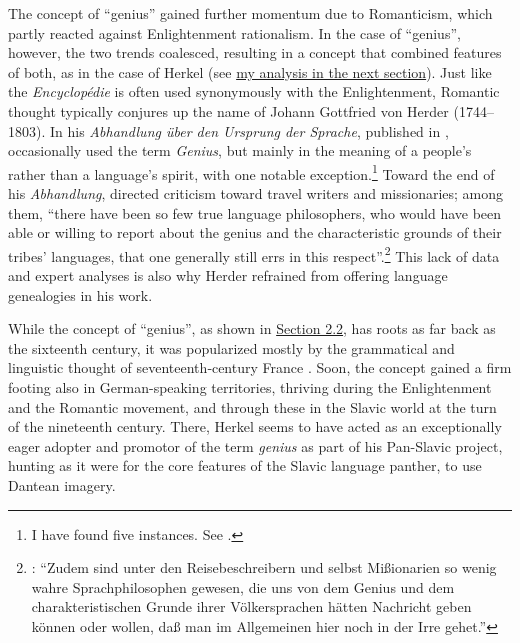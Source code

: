 \noindent The concept of “genius” gained further momentum due to Romanticism, which partly reacted against Enlightenment rationalism. In the case of “genius”, however, the two trends coalesced, resulting in a concept that combined features of both, as in the case of Herkel (see \hyperref[sec:Genius restyled]{my analysis in the next section}). Just like the \textit{Encyclopédie} is often used synonymously with the Enlightenment, Romantic thought typically conjures up the name of Johann Gottfried von Herder (1744--1803). In his \textit{Abhandlung über den Ursprung der Sprache}, published in \citeyear{herder_abhandlung_1772}, \citeauthor{herder_abhandlung_1772} occasionally used the term \textit{Genius}, but mainly in the meaning of a people’s rather than a language’s spirit, with one notable exception.\footnote{I have found five instances. See \citet[81, 85 (twice), 185, 212]{herder_abhandlung_1772}.} Toward the end of his \textit{Abhandlung}, \citet[212]{herder_abhandlung_1772} directed criticism toward travel writers and missionaries; among them, “there have been so few true language philosophers, who would have been able or willing to report about the genius and the characteristic grounds of their tribes’ languages, that one generally still errs in this respect”.\footnote{\citet[212]{herder_abhandlung_1772}: “Zudem sind unter den Reisebeschreibern und selbst Mißionarien so wenig wahre Sprachphilosophen gewesen, die uns von dem Genius und dem charakteristischen Grunde ihrer Völkersprachen hätten Nachricht geben können oder wollen, daß man im Allgemeinen hier noch in der Irre gehet.”} This lack of data and expert analyses is also why Herder refrained from offering language genealogies in his work.

While the concept of “genius”, as shown in \hyperref[sec:Section 2.2]{Section 2.2}, has roots as far back as the sixteenth century, it was popularized mostly by the grammatical and linguistic thought of seventeenth‐century France \citep[784]{hasler_reichtum_2009}. Soon, the concept gained a firm footing also in German-speaking territories, thriving during the Enlightenment and the Romantic movement, and through these in the Slavic world at the turn of the nineteenth century. There, Herkel seems to have acted as an exceptionally eager adopter and promotor of the term \textit{genius} as part of his Pan-Slavic project, hunting as it were for the core features of the Slavic language panther, to use Dantean imagery.

